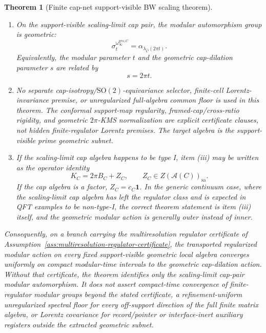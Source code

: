 \documentclass[11pt]{article}
\newtheorem{theorem}{Theorem}[section]
\begin{document}
\begin{theorem}[Finite cap-net support-visible BW scaling theorem]
\begin{enumerate}[label=\textup{(\roman*)},leftmargin=2em]
\item On the support-visible scaling-limit cap pair, the modular automorphism group is geometric:
\[
\sigma_t^{\omega_\infty^{\mathrm{geo},C}}
=
\alpha_{\lambda_{\widehat C}(2\pi t)}.
\]
Equivalently, the modular parameter \(t\) and the geometric cap-dilation parameter \(s\) are related by
\[
s=2\pi t.
\]

\item No separate cap-isotropy/\(\mathrm{SO}(2)\)-equivariance selector, finite-cell Lorentz-invariance premise, or unregularized full-algebra common floor is used in this theorem. The conformal support-map regularity, framed-cap/cross-ratio rigidity, and geometric \(2\pi\)-KMS normalization are explicit certificate clauses, not hidden finite-regulator Lorentz premises. The target algebra is the support-visible prime geometric subnet.

\item If the scaling-limit cap algebra happens to be type I, item \textup{(iii)} may be written as the operator identity
\[
K_C=2\pi B_C+Z_C,\qquad Z_C\in Z(\mathcal A(C))_{\mathrm{sa}}.
\]
If the cap algebra is a factor, \(Z_C=c_C\mathbf1\). In the generic continuum case, where the scaling-limit cap algebra has left the regulator class and is expected in QFT examples to be non-type-I, the correct theorem statement is item \textup{(iii)} itself, and the geometric modular action is generally outer instead of inner.
\end{enumerate}

Consequently, on a branch carrying the multiresolution regulator certificate of
Assumption~\ref{ass:multiresolution-regulator-certificate}, the transported regularized modular
action on every fixed support-visible geometric local algebra converges uniformly on compact
modular-time intervals to the geometric cap-dilation action. Without that certificate, the theorem
identifies only the scaling-limit cap-pair modular automorphism. It does not assert compact-time
convergence of finite-regulator modular groups beyond the stated certificate, a refinement-uniform unregularized spectral floor
for every off-support direction of the full finite matrix algebra, or Lorentz covariance for
record/pointer or interface-inert auxiliary registers outside the extracted geometric subnet.
\end{theorem}
\end{document}

